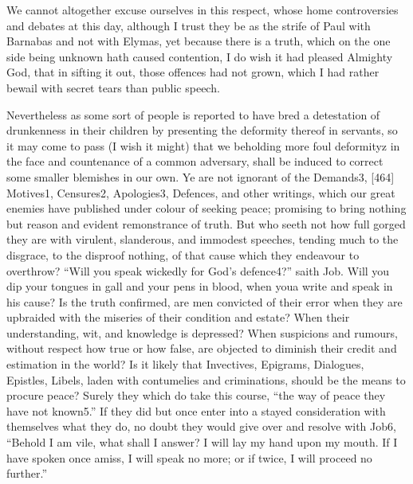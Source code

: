 We cannot altogether excuse ourselves in this respect, whose home controversies and debates at this day, although I trust they be as the strife of Paul with Barnabas and not with Elymas, yet because there is a truth, which on the one side being unknown hath caused contention, I do wish it had pleased Almighty God, that in sifting it out, those offences had not grown, which I had rather bewail with secret tears than public speech.

Nevertheless as some sort of people is reported to have bred a detestation of drunkenness in their children by presenting the deformity thereof in servants, so it may come to pass (I wish it might) that we beholding more foul deformityz in the face and countenance of a common adversary, shall be induced to correct some smaller blemishes in our own. Ye are not ignorant of the Demands3, [464] Motives1, Censures2, Apologies3, Defences, and other writings, which our great enemies have published under colour of seeking peace; promising to bring nothing but reason and evident remonstrance of truth. But who seeth not how full gorged they are with virulent, slanderous, and immodest speeches, tending much to the disgrace, to the disproof nothing, of that cause which they endeavour to overthrow? “Will you speak wickedly for God’s defence4?” saith Job. Will you dip your tongues in gall and your pens in blood, when youa write and speak in his cause? Is the truth confirmed, are men convicted of their error when they are upbraided with the miseries of their condition and estate? When their understanding, wit, and knowledge is depressed? When suspicions and rumours, without respect how true or how false, are objected to diminish their credit and estimation in the world? Is it likely that Invectives, Epigrams, Dialogues, Epistles, Libels, laden with contumelies and criminations, should be the means to procure peace? Surely they which do take this course, “the way of peace they have not known5.” If they did but once enter into a stayed consideration with themselves what they do, no doubt they would give over and resolve with Job6, “Behold I am vile, what shall I answer? I will lay my hand upon my mouth. If I have spoken once amiss, I will speak no more; or if twice, I will proceed no further.”


